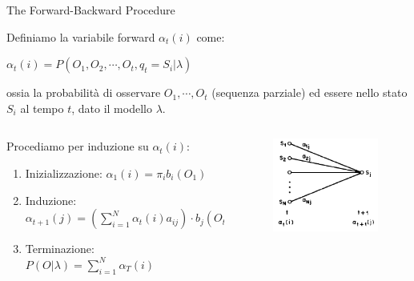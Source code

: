 \documentclass[mathserif]{beamer}
\begin{document}
\begin{frame}{The Forward-Backward Procedure}
 \begin{block}{}
  Definiamo la variabile forward $\alpha_{t}(i)$ come:
	\begin{center}
	$\alpha_{t}(i) = P(O_{1}, O_{2}, \cdots, O_{t}, q_{t} = S_{i}|\lambda)$
	\end{center}
ossia la probabilit\`a di osservare $O_{1}, \cdots, O_{t}$ (sequenza parziale) ed essere nello stato $S_{i}$ al tempo $t$, dato il modello $\lambda$.
 \end{block}
 \begin{block}{}
 \begin{columns}[c]
   \begin{column}[t]{8.5cm}
	Procediamo per induzione su $\alpha_{t}(i)$:
	\begin{enumerate}
 	\item Inizializzazione: $\alpha_{1}(i) = \pi_{i}b_{i}(O_{1})$
	\item Induzione: $\alpha_{t+1}(j) = (\sum_{i = 1}^{N} \alpha_{t}(i)a_{ij}) \cdot b_{j}(O_{t+1})$
	\item Terminazione: $P(O|\lambda) = \sum_{i=1}^{N}\alpha_{T}(i)$
	\end{enumerate}
    
   \end{column}
   \begin{column}[T]{1.5cm}
	\begin{figure}[ht]
	\includegraphics[scale=0.25]{alpha.png}
	\label{fig:alpha}
 \end{figure}
   \end{column}
 \end{columns}
 \end{block}
\end{frame}
\end{document}
